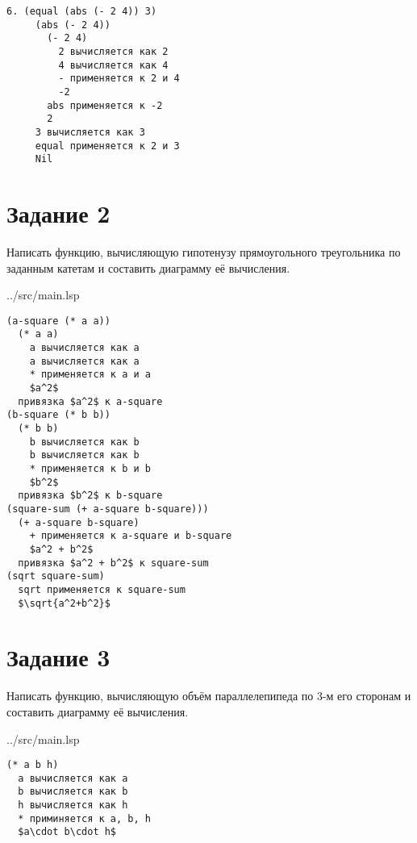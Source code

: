 \begin{lstlisting}[style={scheme}]
6. (equal (abs (- 2 4)) 3)
     (abs (- 2 4))
       (- 2 4)
         2 вычисляется как 2
         4 вычисляется как 4
         - применяется к 2 и 4
         -2
       abs применяется к -2
       2
     3 вычисляется как 3
     equal применяется к 2 и 3
     Nil
\end{lstlisting}

\section*{Задание 2}

Написать функцию, вычисляющую гипотенузу прямоугольного треугольника по заданным катетам и составить диаграмму её вычисления.

\begin{lstinputlisting}[
	caption={Задание 2},
	label={lst:t2},
	style={lsp},
	linerange={11-16},
	]{../src/main.lsp}
\end{lstinputlisting}

\begin{lstlisting}[style={scheme}]
(a-square (* a a))
  (* a a)
    a вычисляется как a
    a вычисляется как a
    * применяется к a и a
    $a^2$
  привязка $a^2$ к a-square
(b-square (* b b))
  (* b b)
    b вычисляется как b
    b вычисляется как b
    * применяется к b и b
    $b^2$
  привязка $b^2$ к b-square
(square-sum (+ a-square b-square)))
  (+ a-square b-square)
    + применяется к a-square и b-square
    $a^2 + b^2$
  привязка $a^2 + b^2$ к square-sum
(sqrt square-sum)
  sqrt применяется к square-sum
  $\sqrt{a^2+b^2}$
\end{lstlisting}

\section*{Задание 3}

Написать функцию, вычисляющую объём параллелепипеда по 3-м его сторонам и составить диаграмму её вычисления.

\begin{lstinputlisting}[
	caption={Задание 3},
	label={lst:t3},
	style={lsp},
	linerange={18-20},
	]{../src/main.lsp}
\end{lstinputlisting}

\begin{lstlisting}[style={scheme}]
(* a b h)
  a вычисляется как a
  b вычисляется как b
  h вычисляется как h
  * приминяется к a, b, h
  $a\cdot b\cdot h$
\end{lstlisting}

